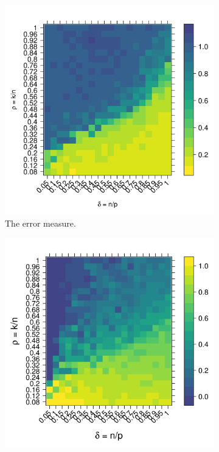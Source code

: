 \documentclass[10pt,letterpaper]{article}
\begin{document}
 \begin{figure}[tbhp] 
     \begin{subfigure}[t]{0.5\linewidth}
       \centering
       \includegraphics[totalheight=6cm]{./figs/error_Stodden_FDR.png}
       \caption{The error measure.}
       \label{figure:error_Stodden_FDR.png}
     \end{subfigure} 
     \begin{subfigure}[t]{0.5\linewidth}
       \centering
       \includegraphics[totalheight=6cm]{./figs/rbo_Stodden_FDR.png}

\end{subfigure}
\end{figure}
\end{document}

